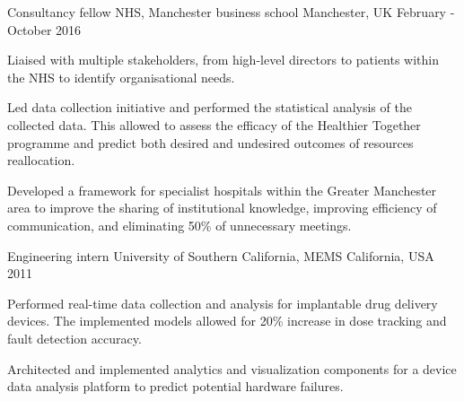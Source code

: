 \begin{cventries}

\cventry
{Consultancy fellow}
{NHS, Manchester business school}
{Manchester, UK}
{February - October 2016}
{
\begin{cvitems}
\item {Liaised with multiple stakeholders, from high-level directors to patients within the NHS to identify organisational needs.}
\item  {Led data collection initiative and performed the statistical analysis of the collected data. This allowed to assess the efficacy of the Healthier Together programme and predict both desired and undesired outcomes of resources reallocation.}
\item{Developed a framework for specialist hospitals within the Greater Manchester area to improve the sharing of institutional knowledge, improving efficiency of communication, and eliminating 50\% of unnecessary meetings.}
\end{cvitems}
}







\cventry
{Engineering intern}
{University of Southern California, MEMS}
{California, USA}
{2011}
{
\begin{cvitems}
\item {Performed real-time data collection and analysis for implantable drug delivery devices. The implemented models allowed for 20\% increase in dose tracking and fault detection accuracy.}
\item {Architected and implemented analytics and visualization components for a device data analysis platform to predict potential hardware failures.}
\end{cvitems}
}


\end{cventries}